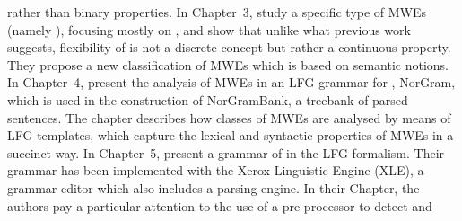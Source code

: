 \documentclass[output=paper]{langsci/langscibook}
\begin{document}
rather\ili{} than\ili{} binary\ili{} properties\ili{}.\ili{}
\ili{}
In\ili{} Chapter\ili{}~3\ili{},\ili{} \ili{}\textit{}\ili{} study\ili{} a\ili{} specific\ili{} type\ili{} of\ili{} MWEs\ili{} \ili{}(namely\ili{} \ili{}\isi{}\ili{})\ili{},\ili{}
focusing\ili{} mostly\ili{} on\ili{} \ili{}\ili{}\ili{},\ili{} and\ili{} show\ili{} that\ili{} unlike\ili{} what\ili{} previous\ili{} work\ili{}
suggests\ili{},\ili{} flexibility\ili{} of\ili{} \ili{}\isi{}\ili{} is\ili{} not\ili{} a\ili{} discrete\ili{} concept\ili{} but\ili{}
rather\ili{} a\ili{} continuous\ili{} property\ili{}.\ili{} They\ili{} propose\ili{} a\ili{} new\ili{} classification\ili{} of\ili{}
MWEs\ili{} which\ili{} is\ili{} based\ili{} on\ili{} semantic\ili{} notions\ili{}.\ili{}
\ili{}
In\ili{} Chapter\ili{}~4\ili{},\ili{} \ili{}\textit{}\ili{} present\ili{} the\ili{} analysis\ili{}
of\ili{} MWEs\ili{} in\ili{} an\ili{} LFG\ili{} grammar\ili{} for\ili{} \ili{}\ili{}\ili{},\ili{} NorGram\ili{},\ili{} which\ili{} is\ili{} used\ili{} in\ili{} the\ili{}
construction\ili{} of\ili{} NorGramBank\ili{},\ili{} a\ili{} treebank\ili{} of\ili{} parsed\ili{} sentences\ili{}.\ili{} The\ili{}
chapter\ili{} describes\ili{} how\ili{} classes\ili{} of\ili{} MWEs\ili{} are\ili{} analysed\ili{} by\ili{} means\ili{} of\ili{} LFG\ili{}
templates\ili{},\ili{} which\ili{} capture\ili{} the\ili{} lexical\ili{} and\ili{} syntactic\ili{} properties\ili{} of\ili{} MWEs\ili{}
in\ili{} a\ili{} succinct\ili{} way\ili{}.\ili{}
\ili{}
In\ili{} Chapter\ili{}~5\ili{},\ili{} \ili{}\textit{}\ili{} present\ili{} a\ili{}
grammar\ili{} of\ili{} \ili{}\ili{}\ili{} in\ili{} the\ili{} LFG\ili{} formalism\ili{}.\ili{} Their\ili{} grammar\ili{} has\ili{} been\ili{}
implemented\ili{} with\ili{} the\ili{} Xerox\ili{} Linguistic\ili{} Engine\ili{} \ili{}(XLE\ili{})\ili{},\ili{} a\ili{} grammar\ili{} editor\ili{}
which\ili{} also\ili{} includes\ili{} a\ili{} parsing\ili{} engine\ili{}.\ili{} In\ili{} their\ili{} Chapter\ili{},\ili{} the\ili{} authors\ili{}
pay\ili{} a\ili{} particular\ili{} attention\ili{} to\ili{} the\ili{} use\ili{} of\ili{} a\ili{} pre\ili{}-processor\ili{} to\ili{} detect\ili{} and\ili{}
\end{document}
